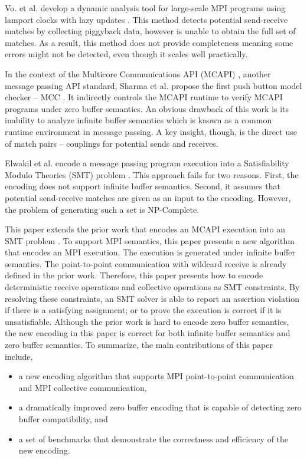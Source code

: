 Vo. et al. develop a dynamic analysis tool for large-scale MPI programs using lamport clocks with lazy updates \cite{DBLP:conf/sc/VoAGSSB10, DBLP:conf/IEEEpact/VoGKSSB11}. This method detects potential send-receive matches by collecting piggyback data, however is unable to obtain the full set of matches. As a result, this method does not provide completeness meaning some errors might not be detected, even though it scales well practically.

In the context of the Multicore Communications API (MCAPI) \cite{mcapi}, another message passing API standard, Sharma et al. propose the first push button model checker -- MCC \cite{DBLP:conf/fmcad/SharmaGMH09}. It indirectly controls the MCAPI runtime to verify MCAPI programs under zero buffer semantics. An obvious drawback of this work is its inability to analyze infinite buffer semantics which is known as a common runtime environment in message passing. A key insight, though, is the direct use of match pairs -- couplings for potential sends and receives.

Elwakil et al. encode a message passing program execution into a Satisfiability Modulo Theories (SMT) problem  \cite{barrett2008satisfiability} \cite{DBLP:conf/issta/ElwakilY10, DBLP:conf/atva/ElwakilYW10}. This approach fails for two reasons. First, the encoding does not support infinite buffer semantics. Second, it assumes that potential send-receive matches are given as an input to the encoding. However, the problem of generating such a set is NP-Complete.

This paper extends the prior work that encodes an MCAPI execution into an SMT problem \cite{DBLP:conf/kbse/HuangMM13}. To support MPI semantics, this paper presents a new algorithm that encodes an MPI execution. The execution is generated under infinite buffer semantics. The point-to-point communication with wildcard receive is already defined in the prior work. Therefore, this paper presents how to encode deterministic receive operations and collective operations as SMT constraints. By resolving these constraints, an SMT solver is able to report an assertion violation if there is a satisfying assignment; or to prove the execution is correct if it is unsatisfiable. Although the prior work \cite{DBLP:conf/kbse/HuangMM13} is hard to encode zero buffer semantics, the new encoding in this paper is correct for both infinite buffer semantics and zero buffer semantics. To summarize, the main contributions of this paper include,
\begin{itemize}
\item a new encoding algorithm that supports MPI point-to-point communication and MPI collective communication,
\item a dramatically improved zero buffer encoding that is capable of detecting zero buffer compatibility, and
\item a set of benchmarks that demonstrate the correctness and efficiency of the new encoding.
\end{itemize}

